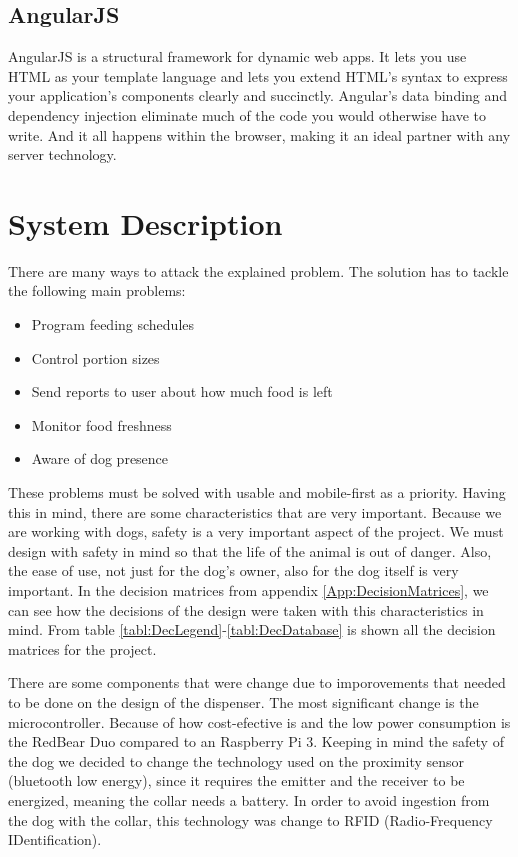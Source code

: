 \documentclass[12pt]{article}
\begin{document}
\subsection{AngularJS}

AngularJS is a structural framework for dynamic web apps. It lets you use HTML as your template language and lets you extend HTML's syntax to express your application's components clearly and succinctly\cite{AngularJS2016}. Angular's data binding and dependency injection eliminate much of the code you would otherwise have to write. And it all happens within the browser, making it an ideal partner with any server technology.


\section{System Description}

There are many ways to attack the explained problem. The solution has to tackle the following main problems:

\begin{itemize}
  \item Program feeding schedules
  \item Control portion sizes
  \item Send reports to user about how much food is left
  \item Monitor food freshness
  \item Aware of dog presence
\end{itemize}

These problems must be solved with usable and mobile-first as a priority. Having this in mind, there are some characteristics that are very important. Because we are working with dogs, safety is a very important aspect of the project. We must design with safety in mind so that the life of the animal is out of danger. Also, the ease of use, not just for the dog's owner, also for the dog itself is very important. In the decision matrices from appendix \ref{App:DecisionMatrices}, we can see how the decisions of the design were taken with this characteristics in mind. From table \ref{tabl:DecLegend}-\ref{tabl:DecDatabase} is shown all the decision matrices for the project.

There are some components that were change due to imporovements that needed to be done on the design of the dispenser. The most significant change is the microcontroller. Because of how cost-efective is and the low power consumption is the RedBear Duo compared to an Raspberry Pi 3. Keeping in mind the safety of the dog we decided to change the technology used on the proximity sensor (bluetooth low energy), since it requires the emitter and the receiver to be energized, meaning the collar needs a battery. In order to avoid ingestion from the dog with the collar, this technology was change to RFID (Radio-Frequency IDentification).
\end{document}
